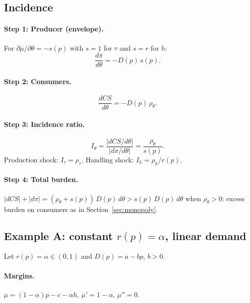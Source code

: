 \documentclass[11pt]{article}
\begin{document}
\subsection{Incidence}

\paragraph{Step 1: Producer (envelope).}
For $\partial\mu/\partial\theta = -s(p)$ with $s=1$ for $\tau$ and $s=r$ for
$h$:
\[
  \frac{d\pi}{d\theta} = -D(p)\,s(p).
  \label{eq:dpi-theta}
\]

\paragraph{Step 2: Consumers.}
\[
  \frac{dCS}{d\theta} = -D(p)\,\rho_\theta.
  \label{eq:dcs-theta}
\]

\paragraph{Step 3: Incidence ratio.}
\begin{equation}
  I_\theta = \frac{|dCS/d\theta|}{|d\pi/d\theta|}
  = \frac{\rho_\theta}{s(p)}.
  \label{eq:incidence-returns}
\end{equation}
Production shock: $I_\tau = \rho_\tau$.  Handling shock: $I_h = \rho_h/r(p)$.

\paragraph{Step 4: Total burden.}
$|dCS| + |d\pi| = (\rho_\theta + s(p))\,D(p)\,d\theta > s(p)\,D(p)\,d\theta$
when $\rho_\theta > 0$: excess burden on consumers as in Section~\ref{sec:monopoly}.

\subsection{Example A: constant $r(p)=\alpha$, linear demand}

Let $r(p)=\alpha \in (0,1)$ and $D(p)=a-bp$, $b>0$.

\paragraph{Margins.}
$\mu = (1-\alpha)p - c - \alpha h$, $\mu' = 1-\alpha$, $\mu''=0$.
\end{document}

